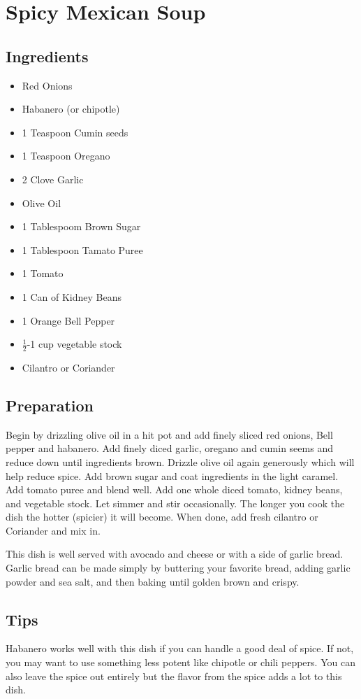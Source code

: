 \thispagestyle{fancy}
\section{Spicy Mexican Soup}
\AddToShipoutPicture*{\MexicanSoup}

\subsection*{Ingredients}
\begin{multicols}{3}
	\begin{itemize}
		\item Red Onions
		\item Habanero (or chipotle)
		\item 1 Teaspoon Cumin seeds
		\item 1 Teaspoon Oregano
		\item 2 Clove Garlic
		\item Olive Oil
		\item 1 Tablespoom Brown Sugar
		\item 1 Tablespoon Tamato Puree
		\item 1 Tomato
		\item 1 Can of Kidney Beans
		\item 1 Orange Bell Pepper
		\item $\frac{1}{2}$-1 cup vegetable stock
		\item Cilantro or Coriander
	\end{itemize}
\end{multicols}

\subsection*{Preparation}

Begin by drizzling olive oil in a hit pot and add finely sliced red onions, Bell pepper and habanero. Add finely diced garlic, oregano and cumin seems and reduce down until ingredients brown. Drizzle olive oil again generously which will help reduce spice. Add brown sugar and coat ingredients in the light caramel. Add tomato puree and blend well. Add one whole diced tomato, kidney beans, and vegetable stock. Let simmer and stir occasionally. The longer you cook the dish the hotter (spicier) it will become. When done, add fresh cilantro or Coriander and mix in. 

\tab This dish is well served with avocado and cheese or with a side of garlic bread. Garlic bread can be made simply by buttering your favorite bread, adding garlic powder and sea salt, and then baking until golden brown and crispy. 

\subsection*{Tips}

Habanero works well with this dish if you can handle a good deal of spice. If not, you may want to use something less potent like chipotle or chili peppers. You can also leave the spice out entirely but the flavor from the spice adds a lot to this dish.